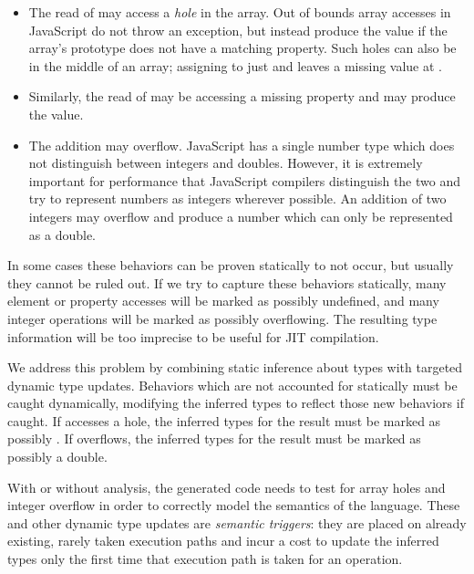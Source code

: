 \begin{itemize}

\item The read of  may access a {\it hole} in the array.
Out of bounds array accesses in JavaScript do not throw an exception,
but instead produce the  value if the array's prototype
does not have a matching property.
Such holes can also be in the middle of an array;
assigning to just  and  leaves a missing
value at .

\item Similarly, the read of  may be accessing a missing property
and may produce the
 value.

\item The addition  may overflow.
JavaScript has a single number type which does not distinguish between
integers and doubles.
However, it is extremely important for performance that JavaScript compilers
distinguish the two and try to represent numbers as
integers wherever possible.
An addition of two integers may overflow and produce a number which can
only be represented as a double.

\end{itemize}

In some cases these behaviors can be proven statically to not occur,
but usually they cannot be ruled out.
If we try to capture these behaviors statically, many element or property
accesses will be marked as possibly undefined, and many integer operations
will be marked as possibly overflowing.
The resulting type information will be too imprecise to be useful for
JIT compilation.

We address this problem by combining static inference about types
with targeted dynamic type updates.
Behaviors which are not accounted for statically must be caught dynamically,
modifying the inferred types to reflect
those new behaviors if caught.
If  accesses a hole, the inferred types for the result must be
marked as possibly .
If  overflows, the inferred types for the result must be
marked as possibly a double.

With or without analysis, the generated code needs to test for array holes
and integer overflow in order to correctly model the semantics of the language.
These and other dynamic type updates are {\it semantic triggers}:
they are placed on already existing, rarely taken execution paths
and incur a cost to update the inferred types only the first time that
execution path is taken for an operation.

